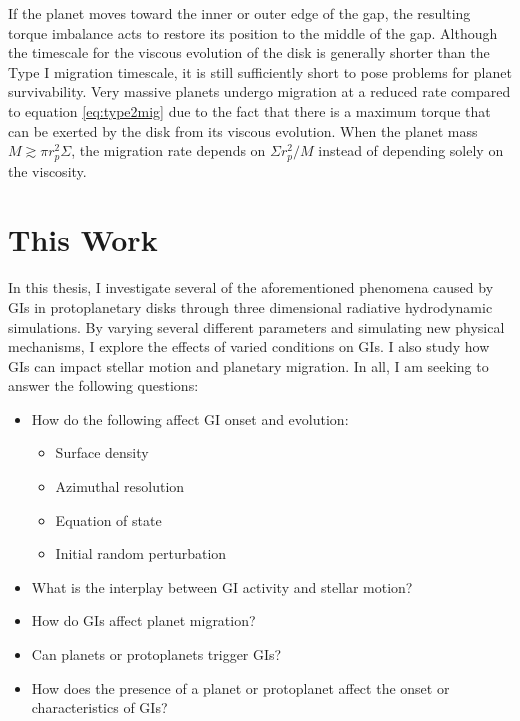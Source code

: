 If the planet moves toward the inner or outer edge of the gap, the resulting torque imbalance acts to restore its position to the middle of the gap. Although the timescale for the viscous evolution of the disk is generally shorter than the Type I migration timescale, it is still sufficiently short to pose problems for planet survivability. Very massive planets undergo migration at a reduced rate compared to equation \eqref{eq:type2mig} due to the fact that there is a maximum torque that can be exerted by the disk from its viscous evolution. When the planet mass $M\gtrsim \pi r_p^2\Sigma$, the migration rate depends on $\Sigma r_p^2/M$ instead of depending solely on the viscosity. 

\section{This Work}

In this thesis, I investigate several of the aforementioned phenomena caused by GIs in protoplanetary disks through three dimensional radiative hydrodynamic simulations. By varying several different parameters and simulating new physical mechanisms, I explore the effects of varied conditions on GIs. I also study how GIs can impact stellar motion and planetary migration. In all, I am seeking to answer the following questions:
\begin{itemize}
\item How do the following affect GI onset and evolution:
\begin{itemize}
\item Surface density
\item Azimuthal resolution
\item Equation of state
\item Initial random perturbation
\end{itemize}
\item What is the interplay between GI activity and stellar motion?
\item How do GIs affect planet migration?
\item Can planets or protoplanets trigger GIs?
\item How does the presence of a planet or protoplanet affect the onset or characteristics of GIs? 
\end{itemize}

